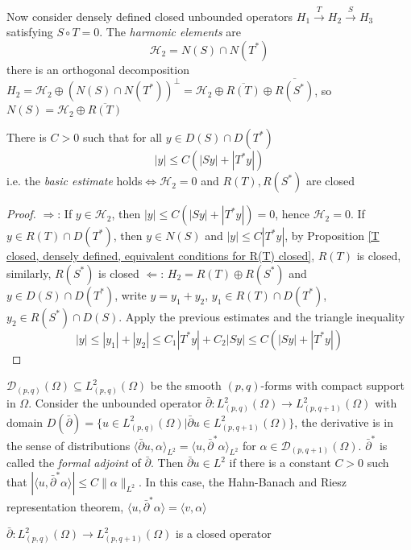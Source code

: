 \documentclass[../main.tex]{subfiles}
\begin{document}
\begin{definition}
Now consider densely defined closed unbounded operators $H_1\xrightarrow T H_2\xrightarrow S H_3$ satisfying $S\circ T=0$. The \textit{harmonic elements} are 
\[\mathcal H_2=N(S)\cap N(T^*)\]
there is an orthogonal decomposition $H_2=\mathcal H_2\oplus(N(S)\cap N(T^*))^\perp=\mathcal H_2\oplus\overline{R(T)}\oplus\overline{R(S^*)}$, so $N(S)=\mathcal H_2\oplus\overline{R(T)}$
\end{definition}

\begin{theorem}
There is $C>0$ such that for all $y\in D(S)\cap D(T^*)$
\begin{equation}\label{basic estimate}
|y|\leq C(|Sy|+|T^*y|)
\end{equation}
i.e. the \textit{basic estimate} holds$\iff\mathcal H_2=0$ and $R(T),R(S^*)$ are closed
\end{theorem}

\begin{proof}
$\Rightarrow$: If $y\in\mathcal H_2$, then $|y|\leq C(|Sy|+|T^*y|)=0$, hence $\mathcal H_2=0$. If $y\in R(T)\cap D(T^*)$, then $y\in N(S)$ and $|y|\leq C|T^*y|$, by Proposition \ref{T closed, densely defined, equivalent conditions for R(T) closed}, $R(T)$ is closed, similarly, $R(S^*)$ is closed
$\Leftarrow$: $H_2=R(T)\oplus R(S^*)$ and $y\in D(S)\cap D(T^*)$, write $y=y_1+y_2$, $y_1\in R(T)\cap D(T^*)$, $y_2\in R(S^*)\cap D(S)$. Apply the previous estimates and the triangle inequality
\[|y|\leq|y_1|+|y_2|\leq C_1|T^*y|+C_2|Sy|\leq C(|Sy|+|T^*y|)\]
\end{proof}

 $\mathcal D_{(p,q)}(\Omega)\subseteq L^2_{(p,q)}(\Omega)$ be the smooth $(p,q)$-forms with compact support in $\Omega$. Consider the unbounded operator $\bar\partial:L^2_{(p,q)}(\Omega)\to L^2_{(p,q+1)}(\Omega)$ with domain $D(\bar\partial)=\{u\in L^2_{(p,q)}(\Omega)|\bar\partial u\in L^2_{(p,q+1)}(\Omega)\}$, the derivative is in the sense of distributions $\langle \bar\partial u,\alpha\rangle_{L^2}=\langle u,\bar\partial^*\alpha\rangle_{L^2}$ for $\alpha\in\mathcal D_{(p,q+1)}(\Omega)$. $\bar\partial^*$ is called the \textit{formal adjoint} of $\bar\partial$. Then $\bar\partial u\in L^2$ if there is a constant $C>0$ such that $|\langle u,\bar\partial^*\alpha\rangle|\leq C\|\alpha\|_{L^2}$. In this case, the Hahn-Banach and Riesz representation theorem, $\langle u,\bar\partial^*\alpha\rangle=\langle v,\alpha\rangle$
 
\begin{proposition}
$\bar\partial:L^2_{(p,q)}(\Omega)\to L^2_{(p,q+1)}(\Omega)$ is a closed operator
\end{proposition}
 
\end{document}
